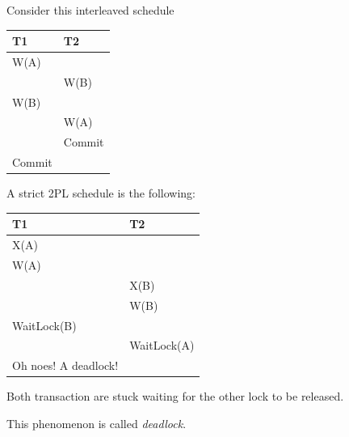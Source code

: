 \documentclass{beamer}
\begin{document}
\begin{slide}{
	\item Consider this interleaved schedule
	\begin{table}
		\tiny
		\begin{tabular}{l|l}
			T1 & T2 \\
			\hline
			W(A) & \\
			& W(B) \\
			W(B) & \\
			& W(A) \\
			& Commit \\
			Commit & \\
		\end{tabular}
	\end{table}	
	\item A strict 2PL schedule is the following:
	\begin{table}
		\tiny
		\begin{tabular}{l|l}
			T1 & T2 \\
			\hline
			X(A) & \\
			W(A) & \\
			& X(B) \\
			& W(B) \\
			WaitLock(B) & \\
			& WaitLock(A)\\
			Oh noes! A deadlock! & \\
		\end{tabular}
	\end{table}
	\item Both transaction are stuck waiting for the other lock to be released.
	\item This phenomenon is called \textit{deadlock}.
}\end{slide}
\end{document}
